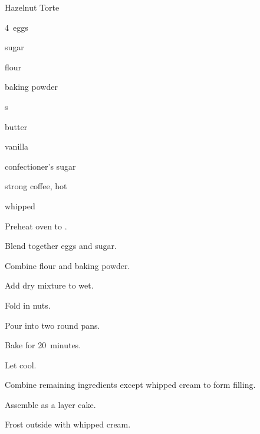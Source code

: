 \begin{recipe}{Hazelnut Torte}{}{}

\begin{ingredients}
\item 4~eggs
\item \C{\threequarter} sugar
\item {} flour
\item \Tp{2\half} baking powder
\item {} s
\item {} butter
\item {} 
\item {} vanilla
\item {} confectioner's sugar
\item {} strong coffee, hot
\item whipped 
\end{ingredients}

\begin{directions}
\item Preheat oven to .
\item Blend together eggs and sugar.
\item Combine flour and baking powder.
\item Add dry mixture to wet.
\item Fold in nuts.
\item Pour into two  round pans.
\item Bake for 20~minutes.
\item Let cool.
\item Combine remaining ingredients except whipped cream to form filling.
\item Assemble as a layer cake.
\item Frost outside with whipped cream.
\end{directions}

\end{recipe}
